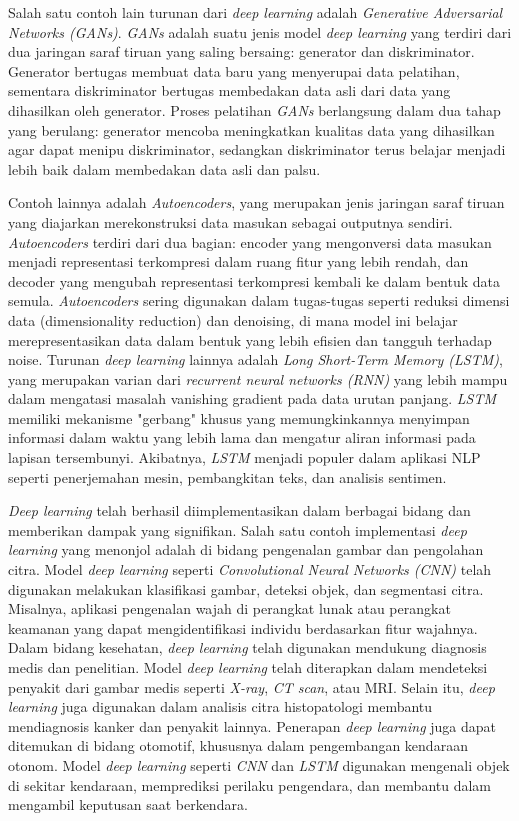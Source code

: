 Salah satu contoh lain turunan dari \textit{deep learning} adalah \textit{Generative Adversarial Networks (GANs)}. \textit{GANs} adalah suatu jenis model \textit{deep learning} yang terdiri dari dua jaringan saraf tiruan yang saling bersaing: generator dan diskriminator. Generator bertugas membuat data baru yang menyerupai data pelatihan, sementara diskriminator bertugas membedakan data asli dari data yang dihasilkan oleh generator. Proses pelatihan \textit{GANs} berlangsung dalam dua tahap yang berulang: generator mencoba meningkatkan kualitas data yang dihasilkan agar dapat menipu diskriminator, sedangkan diskriminator terus belajar menjadi lebih baik dalam membedakan data asli dan palsu.

Contoh lainnya adalah \textit{Autoencoders}, yang merupakan jenis jaringan saraf tiruan yang diajarkan merekonstruksi data masukan sebagai outputnya sendiri. \textit{Autoencoders} terdiri dari dua bagian: encoder yang mengonversi data masukan menjadi representasi terkompresi dalam ruang fitur yang lebih rendah, dan decoder yang mengubah representasi terkompresi kembali ke dalam bentuk data semula. \textit{Autoencoders} sering digunakan dalam tugas-tugas seperti reduksi dimensi data (dimensionality reduction) dan denoising, di mana model ini belajar merepresentasikan data dalam bentuk yang lebih efisien dan tangguh terhadap noise. Turunan \textit{deep learning} lainnya adalah \textit{Long Short-Term Memory (LSTM)}, yang merupakan varian dari \textit{recurrent neural networks (RNN)} yang lebih mampu dalam mengatasi masalah vanishing gradient pada data urutan panjang. \textit{LSTM} memiliki mekanisme "gerbang" khusus yang memungkinkannya menyimpan informasi dalam waktu yang lebih lama dan mengatur aliran informasi pada lapisan tersembunyi. Akibatnya, \textit{LSTM} menjadi populer dalam aplikasi NLP seperti penerjemahan mesin, pembangkitan teks, dan analisis sentimen.

\textit{Deep learning} telah berhasil diimplementasikan dalam berbagai bidang dan memberikan dampak yang signifikan. Salah satu contoh implementasi \textit{deep learning} yang menonjol adalah di bidang pengenalan gambar dan pengolahan citra. Model \textit{deep learning} seperti \textit{Convolutional Neural Networks (CNN)} telah digunakan melakukan klasifikasi gambar, deteksi objek, dan segmentasi citra. Misalnya, aplikasi pengenalan wajah di perangkat lunak atau perangkat keamanan yang dapat mengidentifikasi individu berdasarkan fitur wajahnya. Dalam bidang kesehatan, \textit{deep learning} telah digunakan mendukung diagnosis medis dan penelitian. Model \textit{deep learning} telah diterapkan dalam mendeteksi penyakit dari gambar medis seperti \textit{X-ray},\textit{ CT scan}, atau MRI. Selain itu, \textit{deep learning} juga digunakan dalam analisis citra histopatologi membantu mendiagnosis kanker dan penyakit lainnya. Penerapan \textit{deep learning} juga dapat ditemukan di bidang otomotif, khususnya dalam pengembangan kendaraan otonom. Model \textit{deep learning} seperti \textit{CNN} dan \textit{LSTM} digunakan mengenali objek di sekitar kendaraan, memprediksi perilaku pengendara, dan membantu dalam mengambil keputusan saat berkendara.

